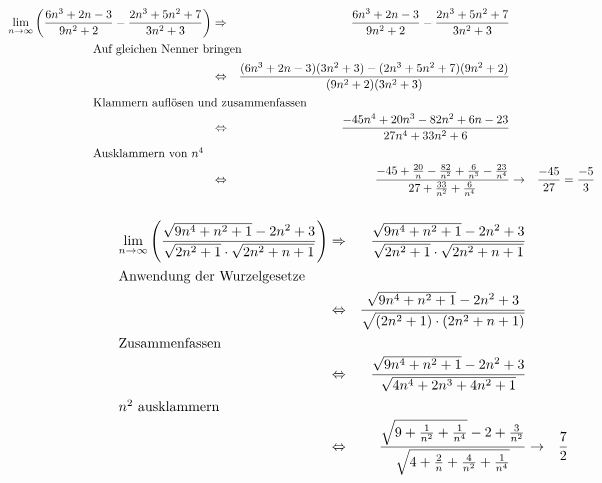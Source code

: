 \documentclass[10pt,a4paper,oneside,ngerman,numbers=noenddot]{scrartcl}
\begin{document}
\subsubsection{} %
\begin{alignat*}{3}
\hspace{-2.5cm}
\underset{n \rightarrow \infty}{\text{lim}} \left( \frac{6n^{3}+2n-3}{9n^{2}+2} - \frac{2n^{3}+5n^{2}+7}{3n^{2}+3} \right) &\Rightarrow & \frac{6n^{3}+2n-3}{9n^{2}+2} - \frac{2n^{3}+5n^{2}+7}{3n^{2}+3} && \\
\intertext{Auf gleichen Nenner bringen}
\hspace{-2.5cm}
&\Leftrightarrow & \frac{(6n^{3}+2n-3)(3n^{2}+3) - (2n^{3}+5n^{2}+7)(9n^{2}+2)}{(9n^{2}+2)(3n^{2}+3)} && \\
\intertext{Klammern auflösen und zusammenfassen}
\hspace{-2.5cm}
&\Leftrightarrow & \frac{-45n^{4} + 20n^{3}-82n^{2}+6n-23}{27n^{4}+33n^{2}+6} && \\
\intertext{Ausklammern von $n^{4}$}
\hspace{-2.5cm}
&\Leftrightarrow & \frac{-45 + \frac{20}{n}-\frac{82}{n^{2}}+\frac{6}{n^{3}}-\frac{23}{n^{4}}}{27+\frac{33}{n^{2}}+\frac{6}{n^{4}}} &\rightarrow & \frac{-45}{27} = \frac{-5}{3}
\end{alignat*}
\subsubsection{} %
\begin{alignat*}{3}
\underset{n \rightarrow \infty}{\text{lim}} \left( \frac{\sqrt{9n^{4}+n^{2}+1}-2n^{2}+3}{\sqrt{2n^{2}+1} \cdot \sqrt{2n^{2}+n+1}} \right) &\Rightarrow & \frac{\sqrt{9n^{4}+n^{2}+1}-2n^{2}+3}{\sqrt{2n^{2}+1} \cdot \sqrt{2n^{2}+n+1}} && \\
\intertext{Anwendung der Wurzelgesetze}
&\Leftrightarrow &\frac{\sqrt{9n^{4}+n^{2}+1}-2n^{2}+3}{\sqrt{(2n^{2}+1) \cdot (2n^{2}+n+1)}} && \\
\intertext{Zusammenfassen}
&\Leftrightarrow &\frac{\sqrt{9n^{4}+n^{2}+1}-2n^{2}+3}{\sqrt{4n^{4}+2n^{3}+4n^{2} + 1}} && \\
\intertext{$n^{2}$ ausklammern}
&\Leftrightarrow &\frac{\sqrt{9+\frac{1}{n^{2}}+\frac{1}{n^{4}}}-2+\frac{3}{n^{2}}}{\sqrt{4+\frac{2}{n}+\frac{4}{n^{2}} + \frac{1}{n^{4}}}} &\rightarrow & \frac{7}{2}
\end{alignat*}
\section{} %
\end{document}
